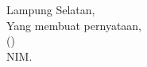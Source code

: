 \begin{flushright}
	\begin{minipage}{0.45\textwidth}\centering\singlespacing
		Lampung Selatan, \printtanggallaporan\\
		Yang membuat pernyataan,\\[1.4cm]
		(\theauthor)\\
		NIM. \printnim
	\end{minipage}
\end{flushright}
\endgroup
\clearpage

